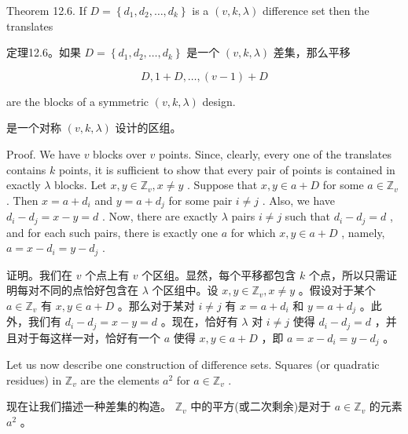 \documentclass[10pt]{article}
\begin{document}
Theorem 12.6. If \(D = \left\{  {{d}_{1},{d}_{2},\ldots ,{d}_{k}}\right\}\) is a \(\left( {v,k,\lambda }\right)\) difference set then the translates

\begin{tcolorbox}\relax
定理12.6。如果 \(D = \left\{  {{d}_{1},{d}_{2},\ldots ,{d}_{k}}\right\}\) 是一个 \(\left( {v,k,\lambda }\right)\) 差集，那么平移
\end{tcolorbox}

\[
D,1 + D,\ldots ,\left( {v - 1}\right)  + D
\]

are the blocks of a symmetric \(\left( {v,k,\lambda }\right)\) design.

\begin{tcolorbox}\relax
是一个对称 \(\left( {v,k,\lambda }\right)\) 设计的区组。
\end{tcolorbox}

Proof. We have \(v\) blocks over \(v\) points. Since, clearly, every one of the translates contains \(k\) points, it is sufficient to show that every pair of points is contained in exactly \(\lambda\) blocks. Let \(x,y \in  {\mathbb{Z}}_{v},x \neq  y\) . Suppose that \(x,y \in  a + D\) for some \(a \in  {\mathbb{Z}}_{v}\) . Then \(x = a + {d}_{i}\) and \(y = a + {d}_{j}\) for some pair \(i \neq  j\) . Also, we have \({d}_{i} - {d}_{j} = x - y = d\) . Now, there are exactly \(\lambda\) pairs \(i \neq  j\) such that \({d}_{i} - {d}_{j} = d\) , and for each such pairs, there is exactly one \(a\) for which \(x,y \in  a + D\) , namely, \(a = x - {d}_{i} = y - {d}_{j}\) .

\begin{tcolorbox}\relax
证明。我们在 \(v\) 个点上有 \(v\) 个区组。显然，每个平移都包含 \(k\) 个点，所以只需证明每对不同的点恰好包含在 \(\lambda\) 个区组中。设 \(x,y \in  {\mathbb{Z}}_{v},x \neq  y\) 。假设对于某个 \(a \in  {\mathbb{Z}}_{v}\) 有 \(x,y \in  a + D\) 。那么对于某对 \(i \neq  j\) 有 \(x = a + {d}_{i}\) 和 \(y = a + {d}_{j}\) 。此外，我们有 \({d}_{i} - {d}_{j} = x - y = d\) 。现在，恰好有 \(\lambda\) 对 \(i \neq  j\) 使得 \({d}_{i} - {d}_{j} = d\) ，并且对于每这样一对，恰好有一个 \(a\) 使得 \(x,y \in  a + D\) ，即 \(a = x - {d}_{i} = y - {d}_{j}\) 。
\end{tcolorbox}

Let us now describe one construction of difference sets. Squares (or quadratic residues) in \({\mathbb{Z}}_{v}\) are the elements \({a}^{2}\) for \(a \in  {\mathbb{Z}}_{v}\) .

\begin{tcolorbox}\relax
现在让我们描述一种差集的构造。 \({\mathbb{Z}}_{v}\) 中的平方(或二次剩余)是对于 \(a \in  {\mathbb{Z}}_{v}\) 的元素 \({a}^{2}\) 。
\end{tcolorbox}
\end{document}
